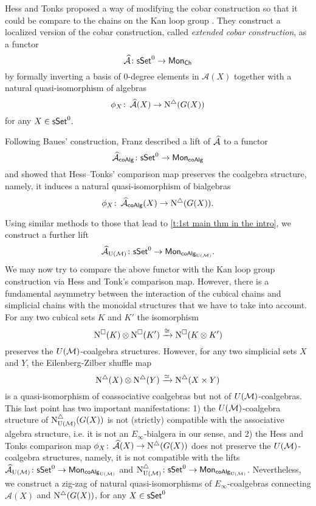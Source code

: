 Hess and Tonks proposed a way of modifying the cobar construction so that it could be compare to the chains on the Kan loop group \cite{hess2010cobar}. They construct a localized version of the cobar construction, called \textit{extended cobar construction}, as a functor
$$\operatorname{\mathcal{\widehat{A}}} \colon \mathsf{sSet}^0 \to \mathsf{Mon}_{\mathsf{Ch}}$$
by formally inverting a basis of $0$-degree elements in $\mathcal{A}(X)$ together with a natural quasi-isomorphism of algebras
\begin{equation*}
\phi_X \colon \operatorname{\mathcal{\widehat{A}}}(X) \to \operatorname{N^{\triangle}}(G(X))
\end{equation*}
for any $X \in \mathsf{sSet}^0.$

Following Baues’ construction, Franz described a lift of $\operatorname{\mathcal{\widehat{A}}}$ to a functor
\begin{equation*}
\operatorname{\mathcal{\widehat{A}}}_{\mathsf{coAlg}} \colon \mathsf{sSet}^0 \to \mathsf{Mon}_{\mathsf{coAlg}}
\end{equation*}
and showed that Hess--Tonks' comparison map preserves the coalgebra structure, namely, it induces a natural quasi-isomorphism of bialgebras
\begin{equation*}
\phi_X \colon \operatorname{\mathcal{\widehat{A}}}_{\mathsf{coAlg}}(X) \to \operatorname{N^{\triangle}} (G(X)).
\end{equation*}

Using similar methods to those that lead to \cref{t:1st main thm in the intro}, we construct a further lift
\begin{equation*}
\operatorname{\mathcal{\widehat{A}}}_{\mathrm{U}(\mathcal{M})} \colon \mathsf{sSet}^0 \to \mathsf{Mon}_{\mathsf{coAlg}_{\mathrm{U}(\mathcal{M})}}.
\end{equation*}
We may now try to compare the above functor with the Kan loop group construction via Hess and Tonk's comparison map. However, there is a fundamental asymmetry between the interaction of the cubical chains and simplicial chains with the monoidal structures that we have to take into account. For any two cubical sets $K$ and $K'$ the isomorphism $$\operatorname{N^{\square}}(K) \otimes \operatorname{N^{\square}}(K') \xrightarrow{\cong} \operatorname{N^{\square}}(K \otimes K')$$ preserves the $U(\mathcal{M})$-coalgebra structures. However, for any two simplicial sets $X$ and $Y$, the Eilenberg-Zilber shuffle map $$\operatorname{N^{\triangle}}(X) \otimes \operatorname{N^{\triangle}}(Y) \xrightarrow{\simeq} \operatorname{N^{\triangle}}(X \times Y)$$ is a quasi-isomorphism of coassociative coalgebras but not of $U(\mathcal{M})$-coalgebras. This last point has two important manifestations: 1) the $U(\mathcal{M})$-coalgebra structure of $\operatorname{N^{\triangle}_{{\mathrm{U}(\mathcal{M})}}}(G(X))$ is not (strictly) compatible with the associative algebra structure, i.e. it is not an $E_{\infty}$-bialgera in our sense, and 2) the Hess and Tonks comparison map $\phi_X \colon \operatorname{\mathcal{\widehat{A}}}(X) \to \operatorname{N^{\triangle}}(G(X))$ does not preserve the $U(\mathcal{M})$-coalgebra structures, namely, it is not compatible with the lifts $\operatorname{\mathcal{\widehat{A}}}_{\mathrm{U}(\mathcal{M})} \colon \mathsf{sSet}^0 \to \mathsf{Mon}_{\mathsf{coAlg}_{\mathrm{U}(\mathcal{M})}}$
and $\operatorname{N^{\triangle}_{{\mathrm{U}(\mathcal{M})}}} \colon \mathsf{sSet}^0 \to \mathsf{Mon}_{\mathsf{coAlg}_{\mathrm{U}(\mathcal{M})}}$. Nevertheless, we construct a zig-zag of natural quasi-isomorphisms of $E_{\infty}$-coalgebras connecting $\widehat{\mathcal{A}}(X)$ and $\operatorname{N^{\triangle}}(G(X))$, for any $X \in \mathsf{sSet}^0$

